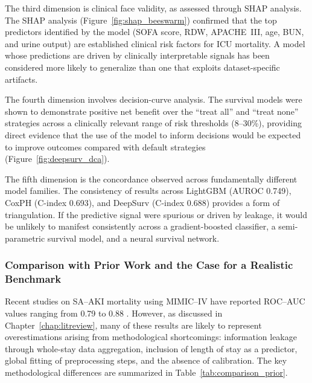 The third dimension is clinical face validity, as assessed through SHAP analysis. The SHAP analysis (Figure~\ref{fig:shap_beeswarm}) confirmed that the top predictors identified by the model (SOFA score, RDW, APACHE~III, age, BUN, and urine output) are established clinical risk factors for ICU mortality. A model whose predictions are driven by clinically interpretable signals has been considered more likely to generalize than one that exploits dataset-specific artifacts.

The fourth dimension involves decision-curve analysis. The survival models were shown to demonstrate positive net benefit over the ``treat all'' and ``treat none'' strategies across a clinically relevant range of risk thresholds (8--30\%), providing direct evidence that the use of the model to inform decisions would be expected to improve outcomes compared with default strategies (Figure~\ref{fig:deepsurv_dca}).

The fifth dimension is the concordance observed across fundamentally different model families. The consistency of results across LightGBM (AUROC 0.749), CoxPH (C-index 0.693), and DeepSurv (C-index 0.688) provides a form of triangulation. If the predictive signal were spurious or driven by leakage, it would be unlikely to manifest consistently across a gradient-boosted classifier, a semi-parametric survival model, and a neural survival network.

\subsubsection{Comparison with Prior Work and the Case for a Realistic Benchmark}
Recent studies on SA--AKI mortality using MIMIC--IV have reported ROC--AUC values ranging from 0.79 to 0.88 \citep{Chen_2025,Li_2023_SciRep,Qu_2024}. However, as discussed in Chapter~\ref{chap:litreview}, many of these results are likely to represent overestimations arising from methodological shortcomings: information leakage through whole-stay data aggregation, inclusion of length of stay as a predictor, global fitting of preprocessing steps, and the absence of calibration. The key methodological differences are summarized in Table~\ref{tab:comparison_prior}.

